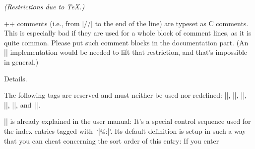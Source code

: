 \sect \emph{(Restrictions due to \TeX{}.)}

\C++ comments (i.e., from |//| to the end of the line) are typeset as C
comments. This is especially bad if they are used for a whole block of
comment lines, as it is quite common. Please put such comment blocks
in the documentation part. (An |\everyline| implementation would be
needed to lift that restriction, and that's impossible in general.)




\chap Details.

The following tags are reserved and must neither be used nor redefined:
 |\ATL|,
 |\B|,
 |\M|,
 |\N|,
 |\PB|,
 and~|\Y|.

|\9| is already explained in the \cweb{} user manual: It's a special
control sequence used for the index entries tagged with~`|@:|'. Its
default definition is setup in such a way that you can cheat
\cweave{} concerning the sort order of this entry: If you enter
